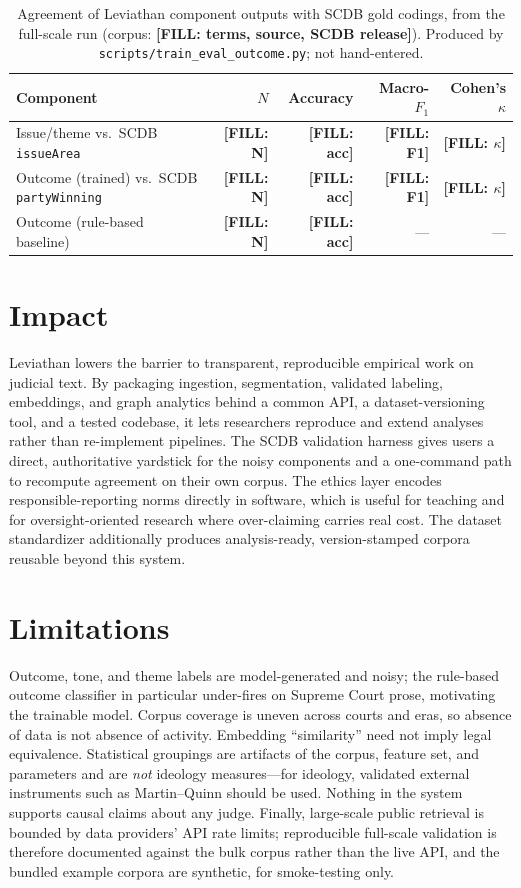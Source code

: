 \documentclass[preprint,12pt]{elsarticle}
\newcommand{\FILL}[1]{{\color{red}\textbf{[FILL: #1]}}}
\begin{document}
\begin{table}[h!]
\centering
\begin{tabular}{lrrrr}
\toprule
Component & $N$ & Accuracy & Macro-$F_1$ & Cohen's $\kappa$ \\
\midrule
Issue/theme vs.\ SCDB \texttt{issueArea} & \FILL{N} & \FILL{acc} & \FILL{F1} & \FILL{$\kappa$} \\
Outcome (trained) vs.\ SCDB \texttt{partyWinning} & \FILL{N} & \FILL{acc} & \FILL{F1} & \FILL{$\kappa$} \\
Outcome (rule-based baseline) & \FILL{N} & \FILL{acc} & --- & --- \\
\bottomrule
\end{tabular}
\caption{Agreement of Leviathan component outputs with SCDB gold codings, from the full-scale run
(corpus: \FILL{terms, source, SCDB release}). Produced by \texttt{scripts/train\_eval\_outcome.py};
not hand-entered.}
\label{tab:val}
\end{table}

\section{Impact}
Leviathan lowers the barrier to transparent, reproducible empirical work on judicial text. By
packaging ingestion, segmentation, validated labeling, embeddings, and graph analytics behind a
common API, a dataset-versioning tool, and a tested codebase, it lets researchers reproduce and
extend analyses rather than re-implement pipelines. The SCDB validation harness gives users a direct,
authoritative yardstick for the noisy components and a one-command path to recompute agreement on
their own corpus. The ethics layer encodes responsible-reporting norms directly in software, which is
useful for teaching and for oversight-oriented research where over-claiming carries real cost. The
dataset standardizer additionally produces analysis-ready, version-stamped corpora reusable beyond
this system.

\section{Limitations}
Outcome, tone, and theme labels are model-generated and noisy; the rule-based outcome classifier in
particular under-fires on Supreme Court prose, motivating the trainable model. Corpus coverage is
uneven across courts and eras, so absence of data is not absence of activity. Embedding
``similarity'' need not imply legal equivalence. Statistical groupings are artifacts of the corpus,
feature set, and parameters and are \emph{not} ideology measures---for ideology, validated external
instruments such as Martin--Quinn \cite{martin2002dynamic} should be used. Nothing in the system
supports causal claims about any judge. Finally, large-scale public retrieval is bounded by data
providers' API rate limits; reproducible full-scale validation is therefore documented against the
bulk corpus rather than the live API, and the bundled example corpora are synthetic, for
smoke-testing only.
\end{document}
